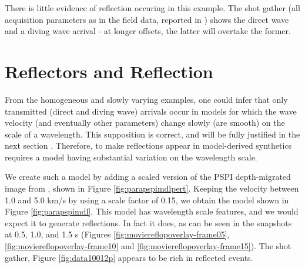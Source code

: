 There is little evidence of reflection occuring in this example. The shot gather (all acquisition parameters as in the field data, reported in \cite[]{basic-caam641:17}) shows the direct wave and a diving wave arrival - at longer offsets, the latter will overtake the former.


\section{Reflectors and Reflection}
From the homogeneous and slowly varying examples, one could infer that only transmitted (direct and diving wave) arrivals occur in models for which the wave velocity (and eventually other parameters) change slowly (are smooth) on the scale of a wavelength. This supposition is correct, and will be fully justified in the next section \cite[]{raytheory-caam641:17}. Therefore, to make reflections appear in model-derived synthetics requires a model having substantial variation on the wavelength scale.

We create such a model by adding a scaled version of the PSPI depth-migrated image from \cite[]{basic-caam641:17}, shown in Figure \ref{fig:parapspimdlpert}. Keeping the velocity between 1.0 and 5.0 km/s by using a scale factor of 0.15, we obtain the model shown in Figure \ref{fig:parapspimdl}. This model has wavelength scale features, and we would expect it to generate reflections. In fact it does, as can be seen in the snapshots at 0.5, 1.0, and 1.5 s (Figures \ref{fig:moviereflopoverlay-frame05}, \ref{fig:moviereflopoverlay-frame10} and \ref{fig:moviereflopoverlay-frame15}). The shot gather, Figure \ref{fig:data10012p} appears to be rich in reflected events.




